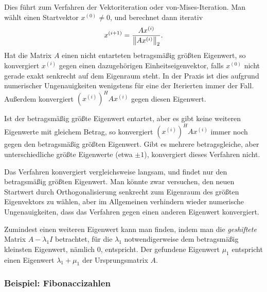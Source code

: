 Dies führt zum Verfahren der Vektoriteration oder von-Mises-Iteration.
Man wählt einen Startvektor $x^{(0)}\neq 0$, und berechnet dann
iterativ
\begin{equation}
  x^{(i+1)} = \frac{A x^{(i)}}{\left\lVert{A x^{(i)}}\right\rVert_2}.
\end{equation}
Hat die Matrix $A$ einen nicht entarteten betragsmäßig größten
Eigenwert, so konvergiert $x^{(i)}$ gegen einen dazugehörigen
Einheitseigenvektor, falls $x^{(0)}$ nicht gerade exakt senkrecht auf
dem Eigenraum steht. In der Praxis ist dies aufgrund numerischer
Ungenauigkeiten wenigstens für eine der Iterierten immer der
Fall. Außerdem konvergiert $\left(x^{(i)}\right)^HAx^{(i)}$ gegen
diesen Eigenwert.

Ist der betragsmäßig größte Eigenwert entartet, aber es gibt keine
weiteren Eigenwerte mit gleichem Betrag, so konvergiert
$\left(x^{(i)}\right)^HAx^{(i)}$ immer noch gegen den betragsmäßig größten
Eigenwert. Gibt es mehrere betragsgleiche, aber unterschiedliche
größte Eigenwerte (etwa $\pm 1$), konvergiert dieses Verfahren nicht.

Das Verfahren konvergiert vergleichsweise langsam, und findet nur den
betragsmäßig größten Eigenwert. Man könnte zwar versuchen, den neuen
Startwert durch Orthogonalisierung senkrecht zum Eigenraum des größten
Eigenvektors zu wählen, aber im Allgemeinen verhindern wieder numerische
Ungenauigkeiten, dass das Verfahren gegen einen anderen Eigenwert
konvergiert.

Zumindest einen weiteren Eigenwert kann man finden, indem man die
\emph{geshiftete} Matrix $A - \lambda_1I$ betrachtet, für die
$\lambda_1$ notwendigerweise dem betragsmäßig kleinsten Eigenwert,
nämlich 0, entspricht. Der gefundene Eigenwert $\mu_1$ entspricht
einen Eigenwert $\lambda_1 + \mu_1$ der Ursprungsmatrix $A$.

\subsubsection{Beispiel: Fibonaccizahlen}

